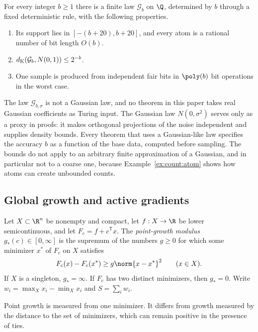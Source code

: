 \begin{lemma}\label{lem:count:gauss-sampler}
For every integer $b\ge1$ there is a finite law $\mathcal G_b$ on $\Q$,
determined by $b$ through a fixed deterministic rule, with the following
properties.
\begin{enumerate}[label=(\alph*)]
\item Its support lies in $[-(b+20),b+20]$, and every atom is a rational
 number of bit length $O(b)$.
\item $d_{\rm K}(\mathcal G_b,N(0,1))\le2^{-b}$.
\item One sample is produced from independent fair bits in $\poly(b)$ bit
 operations in the worst case.
\end{enumerate}
\end{lemma}

The law $\mathcal G_{b,\sigma}$ is not a Gaussian law, and no theorem in this
paper takes real Gaussian coefficients as Turing input. The Gaussian law
$N(0,\sigma^2)$ serves only as a proxy in proofs: it makes orthogonal
projections of the noise independent and supplies density bounds. Every
theorem that uses a Gaussian-like law specifies the accuracy $b$ as a
function of the base data, computed before sampling. The bounds do not
apply to an arbitrary finite approximation of a Gaussian, and in particular
not to a coarse one, because Example~\ref{ex:count:atom} shows how atoms can
create unbounded counts.

\subsection{Global growth and active gradients}\label{sec:count:growth}

\begin{definition}\label{def:count:growth}
Let $X\subset\R^n$ be nonempty and compact, let $f:X\to\R$ be lower
semicontinuous, and let $F_c=f+c^{\mathsf T} x$. The \emph{point-growth modulus}
$g_*(c)\in[0,\infty]$ is the supremum of the numbers $g\ge0$ for which some
minimizer $x^*$ of $F_c$ on $X$ satisfies
\[
 F_c(x)-F_c(x^*)\ge g\norm{x-x^*}^2\qquad(x\in X).
\]
If $X$ is a singleton, $g_*=\infty$. If $F_c$ has two distinct minimizers,
then $g_*=0$. Write $w_i=\max_Xx_i-\min_Xx_i$ and $S=\sum_iw_i$.
\end{definition}

Point growth is measured from one minimizer. It differs from growth measured
by the distance to the set of minimizers, which can remain positive in the
presence of ties.

